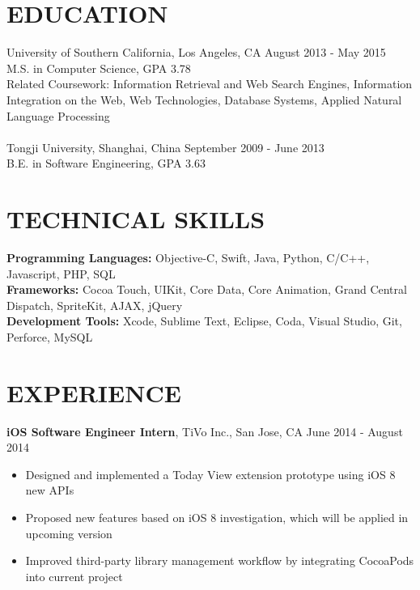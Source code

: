 \documentclass[line, overlapped]{res}
\begin{document}
\address{1133 W 36th Pl Apt 6, Los Angeles, CA 90007}
\address{(213) 806-0803, haishany@usc.edu, github.com/gabrielyeah, linkedin.com/in/haishanye}

\begin{resume}

\section{EDUCATION}
University of Southern California, Los Angeles, CA \hfill August 2013 - May 2015\\
M.S. in Computer Science, GPA 3.78\\
Related Coursework: Information Retrieval and Web Search Engines, Information Integration on the Web, Web Technologies, Database Systems, Applied Natural Language Processing\\
\\
Tongji University, Shanghai, China \hfill September 2009 - June 2013\\
B.E. in Software Engineering, GPA 3.63

\section{TECHNICAL SKILLS}
\textbf{Programming Languages:} Objective-C, Swift, Java, Python, C/C++, Javascript, PHP, SQL\\
\textbf{Frameworks:} Cocoa Touch, UIKit, Core Data, Core Animation, Grand Central Dispatch, SpriteKit, AJAX, jQuery\\
\textbf{Development Tools:} Xcode, Sublime Text, Eclipse, Coda, Visual Studio, Git, Perforce, MySQL

\section{EXPERIENCE}

\textbf{iOS Software Engineer Intern}, TiVo Inc., San Jose, CA \hfill June 2014 - August 2014
 \begin{itemize} \itemsep -2pt
 
 \item Designed and implemented a Today View extension prototype using iOS 8 new APIs
 
 \item Proposed new features based on iOS 8 investigation, which will be applied in upcoming version
 
 \item Improved third-party library management workflow by integrating CocoaPods into current project
 

\end{itemize}
\end{resume}
\end{document}
